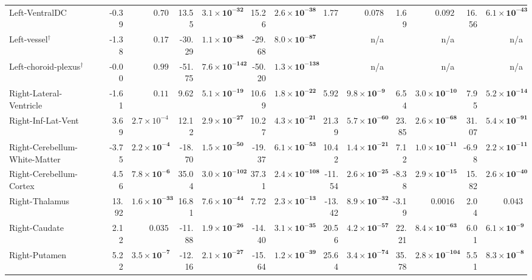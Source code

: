 {\begin{longtable}{llrrrrrrrrrrrr}
Left-VentralDC &  & -0.39 & $0.70$ & 13.55 & $\mathbf{3.1{\times}10^{-32}}$ & 15.26 & $\mathbf{2.6{\times}10^{-38}}$ & 1.77 & $0.078$ & 1.69 & $0.092$ & 16.56 & $\mathbf{6.1{\times}10^{-43}}$ \\
Left-vessel$^{\dagger}$ &  & -1.38 & $0.17$ & -30.29 & $\mathbf{1.1{\times}10^{-88}}$ & -29.68 & $\mathbf{8.0{\times}10^{-87}}$ &  & n/a &  & n/a &  & n/a \\
Left-choroid-plexus$^{\dagger}$ &  & -0.00 & $0.99$ & -51.75 & $\mathbf{7.6{\times}10^{-142}}$ & -50.20 & $\mathbf{1.3{\times}10^{-138}}$ &  & n/a &  & n/a &  & n/a \\
Right-Lateral-Ventricle &  & -1.61 & $0.11$ & 9.62 & $\mathbf{5.1{\times}10^{-19}}$ & 10.69 & $\mathbf{1.8{\times}10^{-22}}$ & 5.92 & $\mathbf{9.8{\times}10^{-9}}$ & 6.54 & $\mathbf{3.0{\times}10^{-10}}$ & 7.95 & $\mathbf{5.2{\times}10^{-14}}$ \\
Right-Inf-Lat-Vent &  & 3.69 & $2.7{\times}10^{-4}$ & 12.12 & $\mathbf{2.9{\times}10^{-27}}$ & 10.27 & $\mathbf{4.3{\times}10^{-21}}$ & 21.39 & $\mathbf{5.7{\times}10^{-60}}$ & 23.85 & $\mathbf{2.6{\times}10^{-68}}$ & 31.07 & $\mathbf{5.4{\times}10^{-91}}$ \\
Right-Cerebellum-White-Matter &  & -3.75 & $\mathbf{2.2{\times}10^{-4}}$ & -18.70 & $\mathbf{1.5{\times}10^{-50}}$ & -19.37 & $\mathbf{6.1{\times}10^{-53}}$ & 10.42 & $\mathbf{1.4{\times}10^{-21}}$ & 7.12 & $\mathbf{1.0{\times}10^{-11}}$ & -6.98 & $\mathbf{2.2{\times}10^{-11}}$ \\
Right-Cerebellum-Cortex &  & 4.56 & $\mathbf{7.8{\times}10^{-6}}$ & 35.04 & $\mathbf{3.0{\times}10^{-102}}$ & 37.31 & $\mathbf{2.4{\times}10^{-108}}$ & -11.54 & $\mathbf{2.6{\times}10^{-25}}$ & -8.38 & $\mathbf{2.9{\times}10^{-15}}$ & 15.82 & $\mathbf{2.6{\times}10^{-40}}$ \\
Right-Thalamus &  & 13.92 & $\mathbf{1.6{\times}10^{-33}}$ & 16.81 & $\mathbf{7.6{\times}10^{-44}}$ & 7.72 & $\mathbf{2.3{\times}10^{-13}}$ & -13.42 & $\mathbf{8.9{\times}10^{-32}}$ & -3.19 & $0.0016$ & 2.04 & $0.043$ \\
Right-Caudate &  & 2.12 & $0.035$ & -11.88 & $\mathbf{1.9{\times}10^{-26}}$ & -14.40 & $\mathbf{3.1{\times}10^{-35}}$ & 20.56 & $\mathbf{4.2{\times}10^{-57}}$ & 22.21 & $\mathbf{8.4{\times}10^{-63}}$ & 6.01 & $\mathbf{6.1{\times}10^{-9}}$ \\
Right-Putamen &  & 5.22 & $\mathbf{3.5{\times}10^{-7}}$ & -12.16 & $\mathbf{2.1{\times}10^{-27}}$ & -15.64 & $\mathbf{1.2{\times}10^{-39}}$ & 25.64 & $\mathbf{3.4{\times}10^{-74}}$ & 35.78 & $\mathbf{2.8{\times}10^{-104}}$ & 5.51 & $\mathbf{8.3{\times}10^{-8}}$ \\

\end{longtable}}
